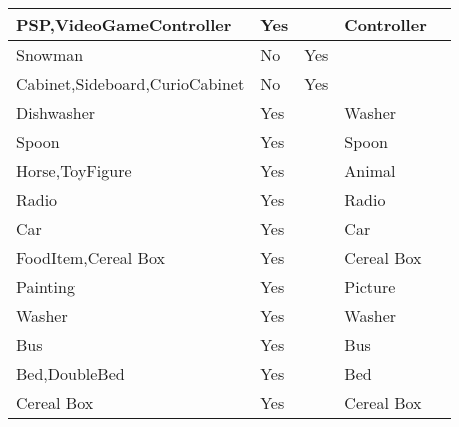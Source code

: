\documentclass{article}
\begin{document}
\begin{longtable}{|l|l|l|l|l|}
PSP,VideoGameController                  & Yes              &                                & Controller     &                             \\ \hline
Snowman                                  & No               & Yes                            &                &                             \\ \hline
Cabinet,Sideboard,CurioCabinet           & No               & Yes                            &                &                             \\ \hline
Dishwasher                               & Yes              &                                & Washer         &                             \\ \hline
Spoon                                    & Yes              &                                & Spoon          &                             \\ \hline
Horse,ToyFigure                          & Yes              &                                & Animal         &                             \\ \hline
Radio                                    & Yes              &                                & Radio          &                             \\ \hline
Car                                      & Yes              &                                & Car            &                             \\ \hline
FoodItem,Cereal Box                      & Yes              &                                & Cereal Box     &                             \\ \hline
Painting                                 & Yes              &                                & Picture        &                             \\ \hline
Washer                                   & Yes              &                                & Washer         &                             \\ \hline
Bus                                      & Yes              &                                & Bus            &                             \\ \hline
Bed,DoubleBed                            & Yes              &                                & Bed            &                             \\ \hline
Cereal Box                               & Yes              &                                & Cereal Box     &                             \\ \hline

\end{longtable}
\end{document}
